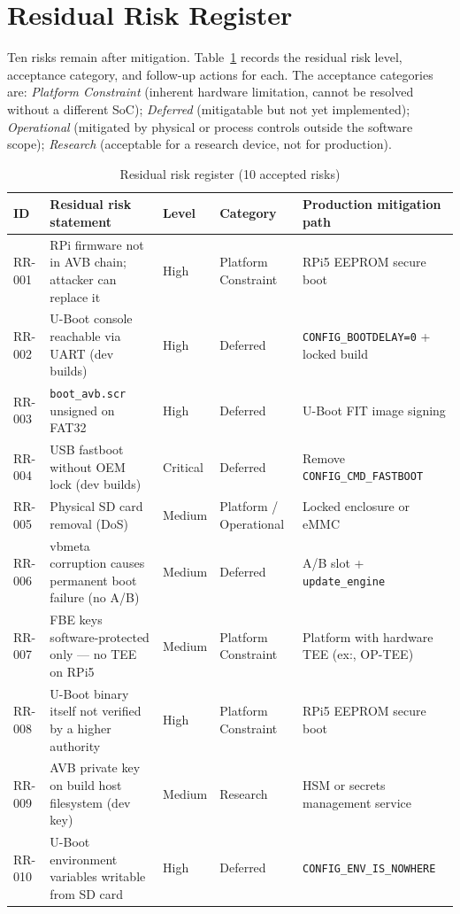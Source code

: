 \section{Residual Risk Register}
\label{sec:tara_residual}

Ten risks remain after mitigation. Table~\ref{tab:residual} records the residual risk level, acceptance category, and follow-up actions for each. The acceptance categories are: \textit{Platform Constraint} (inherent hardware limitation, cannot be resolved without a different SoC); \textit{Deferred} (mitigatable but not yet implemented); \textit{Operational} (mitigated by physical or process controls outside the software scope); \textit{Research} (acceptable for a research device, not for production).

\clearpage
\begin{table}[h!]
\centering
\caption{Residual risk register (10 accepted risks)}
\label{tab:residual}
\small
\begin{tabularx}{\textwidth}{p{0.7cm} >{\raggedright\arraybackslash}X p{1.5cm} p{2.7cm} p{3.5cm}}
\toprule
\textbf{ID} & \textbf{Residual risk statement} & \textbf{Level} & \textbf{Category} & \textbf{Production mitigation path} \\
\midrule
RR-001 & RPi firmware not in AVB chain; attacker can replace it & High & Platform Constraint & RPi5 EEPROM secure boot \\
RR-002 & U-Boot console reachable via UART (dev builds) & High & Deferred & \texttt{CONFIG\_BOOTDELAY=0} + locked build \\
RR-003 & \texttt{boot\_avb.scr} unsigned on FAT32 & High & Deferred & U-Boot FIT image signing \\
RR-004 & USB fastboot without OEM lock (dev builds) & Critical & Deferred & Remove \texttt{CONFIG\_CMD\_FASTBOOT} \\
RR-005 & Physical SD card removal (DoS) & Medium & Platform / Operational & Locked enclosure or eMMC \\
RR-006 & vbmeta corruption causes permanent boot failure (no A/B) & Medium & Deferred & A/B slot + \texttt{update\_engine} \\
RR-007 & FBE keys software-protected only --- no TEE on RPi5 & Medium & Platform Constraint & Platform with hardware TEE (ex:, OP-TEE) \\
RR-008 & U-Boot binary itself not verified by a higher authority & High & Platform Constraint & RPi5 EEPROM secure boot \\
RR-009 & AVB private key on build host filesystem (dev key) & Medium & Research & HSM or secrets management service \\
RR-010 & U-Boot environment variables writable from SD card & High & Deferred & \texttt{CONFIG\_ENV\_IS\_NOWHERE} \\
\bottomrule
\end{tabularx}
\end{table}

